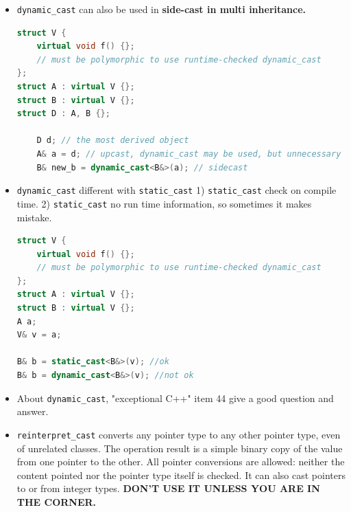 \documentclass[a4paper,12pt,twoside]{book}
\begin{document}
\begin{itemize}
\item \texttt{dynamic\_cast} can also be used in \textbf{side-cast in multi inheritance. }
\begin{lstlisting}[frame=single, language=c++, mathescape=true]
struct V {
    virtual void f() {};
    // must be polymorphic to use runtime-checked dynamic_cast
};
struct A : virtual V {};
struct B : virtual V {};
struct D : A, B {};

    D d; // the most derived object
    A& a = d; // upcast, dynamic_cast may be used, but unnecessary
    B& new_b = dynamic_cast<B&>(a); // sidecast

\end{lstlisting}


\item \texttt{dynamic\_cast} different with \texttt{static\_cast} 1) \texttt{static\_cast} check on compile time. 2) \texttt{static\_cast} no run time information, so sometimes it makes mistake.
\begin{lstlisting}[frame=single, language=c++, mathescape=true]
struct V {
    virtual void f() {};
    // must be polymorphic to use runtime-checked dynamic_cast
};
struct A : virtual V {};
struct B : virtual V {};
A a;
V& v = a;

B& b = static_cast<B&>(v); //ok
B& b = dynamic_cast<B&>(v); //not ok
\end{lstlisting}


\item About \texttt{dynamic\_cast}, "exceptional C++" item 44 give a good question and answer.

\item \texttt{reinterpret\_cast} converts any pointer type to any other pointer type, even of unrelated classes. The operation result is a simple binary copy of the value from one pointer to the other. All pointer conversions are allowed: neither the content pointed nor the pointer type itself is checked. It can also cast pointers to or from integer types. \textbf{DON'T USE IT UNLESS YOU ARE IN THE CORNER.}

\end{itemize}
\end{document}
